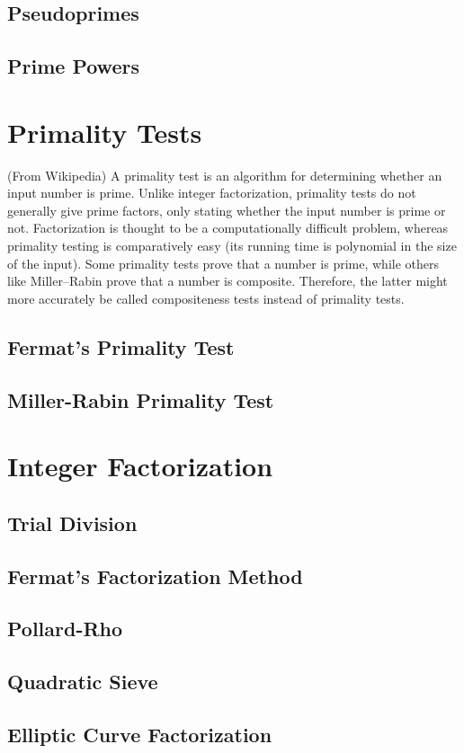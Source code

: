 \documentclass[12pt]{extarticle}
\begin{document}
\subsection*{Pseudoprimes}
\subsection*{Prime Powers}
\section*{Primality Tests}
(From Wikipedia) A primality test is an algorithm for determining whether an input number is prime. Unlike integer factorization, primality tests do not generally give prime factors, only stating whether the input number is prime or not. Factorization is thought to be a computationally difficult problem, whereas primality testing is comparatively easy (its running time is polynomial in the size of the input). Some primality tests prove that a number is prime, while others like Miller–Rabin prove that a number is composite. Therefore, the latter might more accurately be called compositeness tests instead of primality tests.
\subsection*{Fermat's Primality Test}
\subsection*{Miller-Rabin Primality Test}
\section*{Integer Factorization}
\subsection*{Trial Division}
\subsection*{Fermat's Factorization Method}
\subsection*{Pollard-Rho}
\subsection*{Quadratic Sieve}
\subsection*{Elliptic Curve Factorization}
\end{document}
